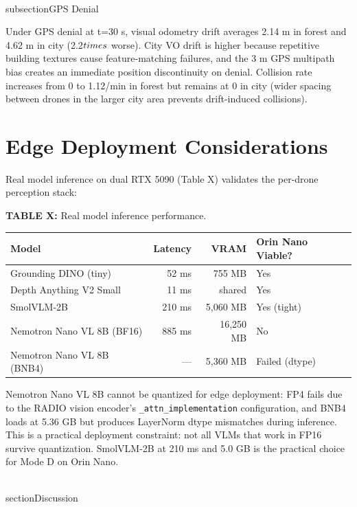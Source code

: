 \documentclass[conference]{IEEEtran}
\begin{document}
\\subsection{GPS Denial}\label{c.-gps-denial}

Under GPS denial at t=30 s, visual odometry drift averages 2.14 m in
forest and 4.62 m in city (2.2$\\times$ worse). City VO drift is higher because
repetitive building textures cause feature-matching failures, and the 3
m GPS multipath bias creates an immediate position discontinuity on
denial. Collision rate increases from 0 to 1.12/min in forest but
remains at 0 in city (wider spacing between drones in the larger city
area prevents drift-induced collisions).

\section{Edge Deployment Considerations}\label{vii.-edge-deployment-considerations}

Real model inference on dual RTX 5090 (Table X) validates the per-drone
perception stack:

\textbf{TABLE X:} Real model inference performance.

{\def\LTcaptype{none} %
\begin{longtable}[]{@{}lrrl@{}}
\toprule\noalign{}
Model & Latency & VRAM & Orin Nano Viable? \\
\midrule\noalign{}
\endhead
\bottomrule\noalign{}
\endlastfoot
Grounding DINO (tiny) & 52 ms & 755 MB & Yes \\
Depth Anything V2 Small & 11 ms & shared & Yes \\
SmolVLM-2B & 210 ms & 5,060 MB & Yes (tight) \\
Nemotron Nano VL 8B (BF16) & 885 ms & 16,250 MB & No \\
Nemotron Nano VL 8B (BNB4) & --- & 5,360 MB & Failed (dtype) \\
\end{longtable}
}

Nemotron Nano VL 8B cannot be quantized for edge deployment: FP4 fails
due to the RADIO vision encoder's \texttt{\_attn\_implementation}
configuration, and BNB4 loads at 5.36 GB but produces LayerNorm dtype
mismatches during inference. This is a practical deployment constraint:
not all VLMs that work in FP16 survive quantization. SmolVLM-2B at 210
ms and 5.0 GB is the practical choice for Mode D on Orin Nano.

\\section{Discussion}\label{viii.-discussion}
\end{document}

